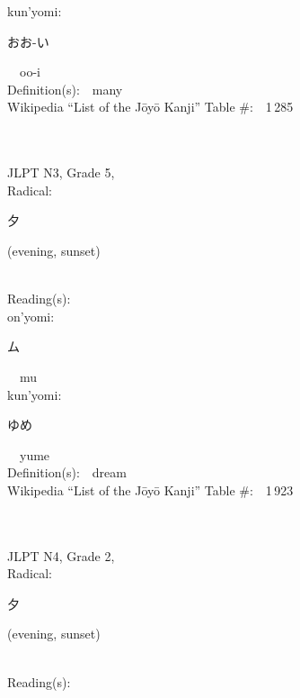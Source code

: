 \begin{multicols}{2}
{\hspace*{1em}}kun'yomi:\ \ \\
{\hspace*{2em}}{\begin{CJK}{UTF8}{min} おお-い \end{CJK}}\ \ oo-i\ \ \\
Definition(s):\ \ many \\
Wikipedia ``List of the J\=oy\=o Kanji'' Table \#:\ \ 1\,285 \\
\ \ \\
{\fontsize{34pt}{40pt}  }\ \ \\  %
{JLPT N3, Grade 5, \\Radical:\ \ {\begin{CJK}{UTF8}{min} 夕 \end{CJK}} (evening, sunset) } \\
Reading(s):\ \ \\
{\hspace*{1em}}on'yomi:\ \ \\
{\hspace*{2em}}{\begin{CJK}{UTF8}{min} ム \end{CJK}}\ \ mu\ \ \\
{\hspace*{1em}}kun'yomi:\ \ \\
{\hspace*{2em}}{\begin{CJK}{UTF8}{min} ゆめ \end{CJK}}\ \ yume\ \ \\
Definition(s):\ \ dream \\
Wikipedia ``List of the J\=oy\=o Kanji'' Table \#:\ \ 1\,923 \\
\ \ \\
{\fontsize{34pt}{40pt}  }\ \ \\  %
{JLPT N4, Grade 2, \\Radical:\ \ {\begin{CJK}{UTF8}{min} 夕 \end{CJK}} (evening, sunset) } \\
Reading(s):\ \ \\

\end{multicols}
